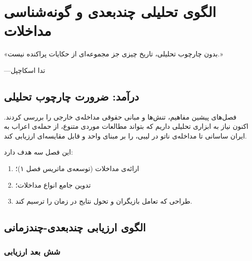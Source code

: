 
\chapter{الگوی تحلیلی چندبعدی و گونه‌شناسی مداخلات}
\label{ch:framework}

\begin{tcolorbox}[quotebox, title={}]
	«بدون چارچوب تحلیلی، تاریخ چیزی جز مجموعه‌ای از حکایات
	پراکنده نیست.»
	
	\hfill ---تدا اسکاچپل
\end{tcolorbox}


\section{درآمد: ضرورت چارچوب تحلیلی}
\label{sec:ch04-intro}

فصل‌های پیشین مفاهیم، تنش‌ها و مبانی حقوقی مداخله‌ی خارجی را
بررسی کردند. اکنون نیاز به ابزاری تحلیلی داریم که بتواند
مطالعات موردی متنوع، از حمله‌ی اعراب به ایران ساسانی تا
مداخله‌ی ناتو در لیبی، را بر مبنای واحد و قابل مقایسه‌ای
ارزیابی کند.

این فصل سه هدف دارد:
\begin{enumerate}[label=\textbf{\arabic*.}, nosep, rightmargin=1em]
	\item ارائه‌ی  مداخلات
	(توسعه‌ی ماتریس فصل ۱)؛
	\item تدوین  جامع انواع مداخلات؛
	\item طراحی  که تعامل بازیگران
	و تحول نتایج در زمان را ترسیم کند.
\end{enumerate}


\section{الگوی ارزیابی چندبعدی-چندزمانی}
\label{sec:ch04-model}

\subsection{شش بعد ارزیابی}
\label{subsec:ch04-dimensions}


